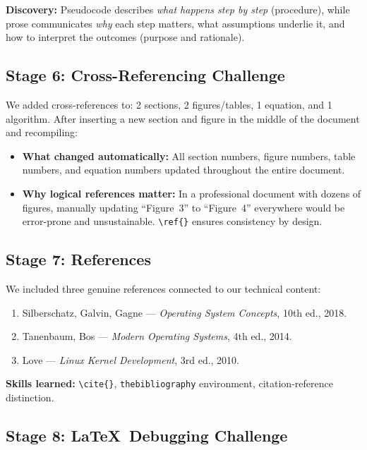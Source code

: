 \documentclass[11pt, a4paper]{article}
\begin{document}
\noindent\textbf{Discovery:} Pseudocode describes \emph{what happens step by step} (procedure), while prose communicates \emph{why} each step matters, what assumptions underlie it, and how to interpret the outcomes (purpose and rationale).

\subsection{Stage 6: Cross-Referencing Challenge}
We added cross-references to: 2 sections, 2 figures/tables, 1 equation, and 1 algorithm. After inserting a new section and figure in the middle of the document and recompiling:
\begin{itemize}[nosep]
    \item \textbf{What changed automatically:} All section numbers, figure numbers, table numbers, and equation numbers updated throughout the entire document.
    \item \textbf{Why logical references matter:} In a professional document with dozens of figures, manually updating ``Figure~3'' to ``Figure~4'' everywhere would be error-prone and unsustainable. \texttt{\textbackslash ref\{\}} ensures consistency by design.
\end{itemize}

\subsection{Stage 7: References}
We included three genuine references connected to our technical content:
\begin{enumerate}[nosep]
    \item Silberschatz, Galvin, Gagne --- \textit{Operating System Concepts}, 10th ed., 2018.
    \item Tanenbaum, Bos --- \textit{Modern Operating Systems}, 4th ed., 2014.
    \item Love --- \textit{Linux Kernel Development}, 3rd ed., 2010.
\end{enumerate}

\noindent\textbf{Skills learned:} \texttt{\textbackslash cite\{\}}, \texttt{thebibliography} environment, citation-reference distinction.

\subsection{Stage 8: \LaTeX\ Debugging Challenge}
\end{document}
